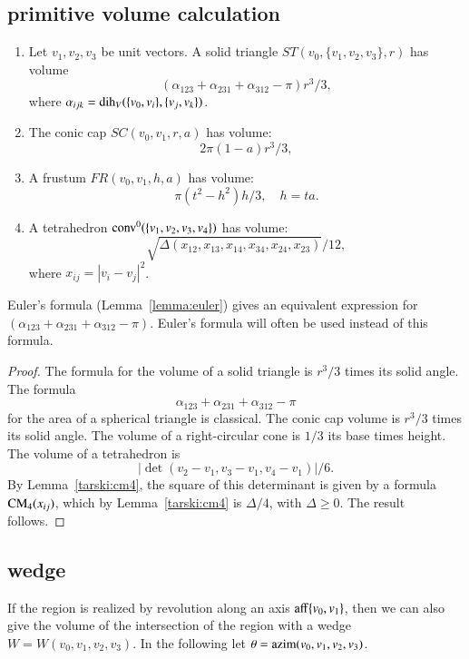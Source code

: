 \subsection{primitive volume calculation}

\begin{lemma} 
\begin{enumerate} 
 \item Let $v_1,v_2,v_3$ be unit vectors.
   A solid triangle $ST(v_0,\{v_1,v_2,v_3\},r)$ has volume
   $$
   (\alpha_{123}+\alpha_{231}+\alpha_{312}-\pi)r^3/3,
   $$
   where $\alpha_{ijk} = \operatorname{dih}_V(\{v_0,v_i\},\{v_j,v_k\})$.
  \item The conic cap $SC(v_0,v_1,r,a)$ has volume:
   $$
    2\pi(1-a) r^3/3,
   $$
 \item A frustum $FR(v_0,v_1,h,a)$ has volume:
   $$
   \pi (t^2-h^2) h/3,\quad h = t a.
   $$
 \item A tetrahedron ${\operatorname{conv}}^0(\{v_1,v_2,v_3,v_4\})$ has volume:
   $$
   \sqrt{\Delta(x_{12},x_{13},x_{14},x_{34},x_{24},x_{23})}/12,
   $$
   where $x_{ij} = |v_i-v_j|^2$.
\end{enumerate}
\end{lemma}

Euler's formula (Lemma~\ref{lemma:euler}) gives an
equivalent expression for $(\alpha_{123}+\alpha_{231}+\alpha_{312}-\pi)$.
Euler's formula will often be used instead of this formula.

\begin{proof}
The formula for the volume of a solid triangle is $r^3/3$ times
its solid angle.  The formula 
   $$\alpha_{123}+\alpha_{231}+\alpha_{312}-\pi$$
for the area of a spherical triangle is classical.    
The conic cap volume is
$r^3/3$ times its solid angle.  
The volume of a right-circular cone is $1/3$ its base times height.
The volume of a tetrahedron is
   $$|\det(v_2-v_1,v_3-v_1,v_4-v_1)|/6.$$
By Lemma~\ref{tarski:cm4}, 
the square of this determinant is given by a formula
${\operatorname{CM}}_4(x_{ij})$, which by Lemma~\ref{tarski:cm4} is
$\Delta/4$, with $\Delta\ge0$.  The result follows.
\end{proof}



\subsection{wedge}

If the region is realized by revolution along an axis ${\operatorname{aff}}\{v_0,v_1\}$, 
then
we can also give the volume of the intersection of the region
with a wedge $W=W(v_0,v_1,v_2,v_3)$.
  In the following
let $\theta = {\operatorname{azim}}(v_0,v_1,v_2,v_3)$.

